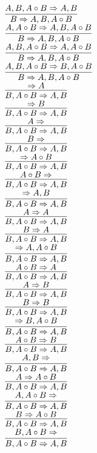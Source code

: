 \documentclass[11pt]{article}
\begin{document}
\begin{center}
\bigskip
\\$\infer{B\Rightarrow A, B, A\circ B}{A, B, A\circ B\Rightarrow A, B}$
\bigskip
\\$\infer{B\Rightarrow A, B, A\circ B}{A, A\circ B\Rightarrow A, B, A\circ B}$
\bigskip
\\$\infer{B\Rightarrow A, B, A\circ B}{A, B, A\circ B\Rightarrow A, A\circ B}$
\bigskip
\\$\infer{B\Rightarrow A, B, A\circ B}{A, B, A\circ B\Rightarrow B, A\circ B}$
\bigskip
\\$\infer{B, A\circ B\Rightarrow A, B}{\Rightarrow A}$
\bigskip
\\$\infer{B, A\circ B\Rightarrow A, B}{\Rightarrow B}$
\bigskip
\\$\infer{B, A\circ B\Rightarrow A, B}{A\Rightarrow }$
\bigskip
\\$\infer{B, A\circ B\Rightarrow A, B}{B\Rightarrow }$
\bigskip
\\$\infer{B, A\circ B\Rightarrow A, B}{\Rightarrow A\circ B}$
\bigskip
\\$\infer{B, A\circ B\Rightarrow A, B}{A\circ B\Rightarrow }$
\bigskip
\\$\infer{B, A\circ B\Rightarrow A, B}{\Rightarrow A, B}$
\bigskip
\\$\infer{B, A\circ B\Rightarrow A, B}{A\Rightarrow A}$
\bigskip
\\$\infer{B, A\circ B\Rightarrow A, B}{B\Rightarrow A}$
\bigskip
\\$\infer{B, A\circ B\Rightarrow A, B}{\Rightarrow A, A\circ B}$
\bigskip
\\$\infer{B, A\circ B\Rightarrow A, B}{A\circ B\Rightarrow A}$
\bigskip
\\$\infer{B, A\circ B\Rightarrow A, B}{A\Rightarrow B}$
\bigskip
\\$\infer{B, A\circ B\Rightarrow A, B}{B\Rightarrow B}$
\bigskip
\\$\infer{B, A\circ B\Rightarrow A, B}{\Rightarrow B, A\circ B}$
\bigskip
\\$\infer{B, A\circ B\Rightarrow A, B}{A\circ B\Rightarrow B}$
\bigskip
\\$\infer{B, A\circ B\Rightarrow A, B}{A, B\Rightarrow }$
\bigskip
\\$\infer{B, A\circ B\Rightarrow A, B}{A\Rightarrow A\circ B}$
\bigskip
\\$\infer{B, A\circ B\Rightarrow A, B}{A, A\circ B\Rightarrow }$
\bigskip
\\$\infer{B, A\circ B\Rightarrow A, B}{B\Rightarrow A\circ B}$
\bigskip
\\$\infer{B, A\circ B\Rightarrow A, B}{B, A\circ B\Rightarrow }$

\end{center}
\end{document}
